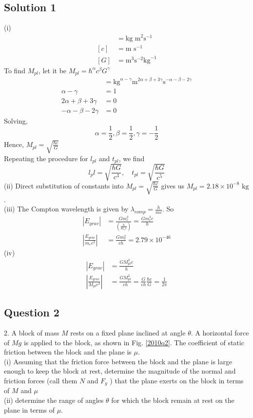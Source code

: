 \documentclass{article}
\begin{document}
\subsection{Solution 1}
(i)
\begin{align}
	[\hbar] &= \text{kg m}^2 \text{s}^{-1} \\
	[c] &= \text{m s}^{-1}\\
	[G] &= \text{m}^3 \text{s}^{-2} \text{kg}^{-1}
\end{align}
To find $M_{pl}$, let it be $M_{pl}=\hbar^\alpha c^\beta G^\gamma$
\begin{align}
	[M_{pl}] &= \text{kg}^{\alpha-\gamma} \text{m}^{2\alpha+\beta+3\gamma} \text{s}^{-\alpha-\beta-2\gamma} \\
	\alpha-\gamma &= 1\\
	2\alpha+\beta+3\gamma &= 0\\
	-\alpha-\beta-2\gamma &=0
\end{align}
Solving, 
\[\alpha=\frac{1}{2}, \beta=\frac{1}{2}, \gamma=-\frac{1}{2}\]
Hence, $M_{pl} = \sqrt{\frac{\hbar c}{G}}$\\
Repeating the procedure for $l_{pl}$ and $t_{pl}$, we find
\[l_pl = \sqrt{\frac{\hbar G}{c^3}}, \quad t_{pl} = \sqrt{\frac{\hbar G}{c^5}}\]
(ii) Direct substitution of constants into $M_{pl} = \sqrt{\frac{\hbar c}{G}}$ gives us $M_{pl} = 2.18 \times 10^{-8} \text{ kg}$.\\
(iii) The Compton wavelength is given by $\lambda_{comp} = \frac{h}{mc}$. So
\begin{align} 
	|E_{grav}| &= \frac{G m_e^2}{\left(\frac{h}{m_e c}\right) } = \frac{Gm_e^3 c}{h} \\
	\left|  \frac{E_{grav}}{m_e c^2} \right| &= \frac{Gm_e^2}{ch} = 2.79 \times 10^{-46}
\end{align}
(iv)
\begin{align} 
	|E_{grav}| &= \frac{GM_{pl}^3 c}{h}\\
	\left|  \frac{E_{grav}}{M_{pl} c^2} \right| &= \frac{GM_{pl}^2}{ch} = \frac{G}{ch} \frac{\hbar c}{G} = \frac{1}{2\pi} 
\end{align}

\subsection{Question 2}
2. A block of mass $M$ rests on a fixed plane inclined at angle $\theta$. A horizontal force of $Mg$ is applied to the block, as shown in Fig. \ref{2010q2}. The coefficient of static friction between the block and the plane is $\mu$. \\
(i) Assuming that the friction force between the block and the plane is large enough to keep the block at rest, determine the magnitude of the normal and friction forces (call them $N$ and $F_y$ ) that the plane exerts on the block in terms of $M$ and $\mu$\\
(ii) determine the range of angles $\theta$ for which the block remain at rest on the plane in terms of $\mu$. 
\end{document}
